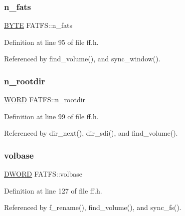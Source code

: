 \mbox{\label{structFATFS_a56716c7e7ac10cf46e73ffb2a2e9b545}} 
\subsubsection{\texorpdfstring{n\+\_\+fats}{n\_fats}}
{\footnotesize\ttfamily \hyperlink{lz4_8c_a4ae1dab0fb4b072a66584546209e7d58}{B\+Y\+TE} F\+A\+T\+F\+S\+::n\+\_\+fats}



Definition at line 95 of file ff.\+h.



Referenced by find\+\_\+volume(), and sync\+\_\+window().

\mbox{\label{structFATFS_a189a00aa038044ffad0fc7f7dcf2aae1}} 
\subsubsection{\texorpdfstring{n\+\_\+rootdir}{n\_rootdir}}
{\footnotesize\ttfamily \hyperlink{integer_8h_a197942eefa7db30960ae396d68339b97}{W\+O\+RD} F\+A\+T\+F\+S\+::n\+\_\+rootdir}



Definition at line 99 of file ff.\+h.



Referenced by dir\+\_\+next(), dir\+\_\+sdi(), and find\+\_\+volume().

\mbox{\label{structFATFS_a8f0ca578755749d204f59dc83f1a7649}} 
\subsubsection{\texorpdfstring{volbase}{volbase}}
{\footnotesize\ttfamily \hyperlink{integer_8h_ad342ac907eb044443153a22f964bf0af}{D\+W\+O\+RD} F\+A\+T\+F\+S\+::volbase}



Definition at line 127 of file ff.\+h.



Referenced by f\+\_\+rename(), find\+\_\+volume(), and sync\+\_\+fs().

